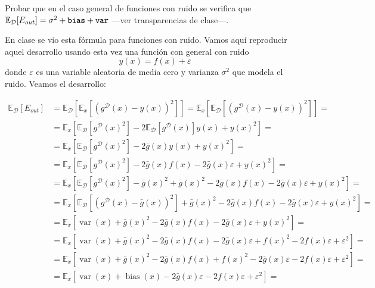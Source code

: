 \documentclass[a4paper, 11pt]{article}
\begin{document}
      \begin{ejercicio}
        Probar que en el caso general de funciones con ruido se verifica que $\mathbb{E}_{\mathcal{D}}[E_{out}]= \sigma^2+\texttt{\textbf{bias}}+\texttt{\textbf{var}}$ ---ver transparencias de clase---.
      \end{ejercicio}

      \begin{solucion}
          En clase se vio esta fórmula para funciones con ruido. Vamos aquí reproducir aquel desarrollo usando esta vez una función con general con ruido
          \[
          y(x) = f(x) + \varepsilon
          \]
          donde $\varepsilon$ es una variable aleatoria de media cero y varianza $\sigma^2$ que modela el ruido. Veamos el desarrollo:

          \begin{align*}
              \mathbb{E}_\mathcal{D}[E_{out}] &= \mathbb{E}_\mathcal{D}[\mathbb{E}_x[(g^\mathcal{D}(x) - y(x))^2]] = \mathbb{E}_x[\mathbb{E}_\mathcal{D}[(g^\mathcal{D}(x) - y(x))^2]] = \\
              &= \mathbb{E}_x[\mathbb{E}_\mathcal{D}[g^\mathcal{D}(x)^2] - 2\mathbb{E}_\mathcal{D}[g^\mathcal{D}(x)]y(x) + y(x)^2] = \\
              &= \mathbb{E}_x[\mathbb{E}_\mathcal{D}[g^\mathcal{D}(x)^2] - 2\bar{g}(x)y(x) + y(x)^2] = \\
              &= \mathbb{E}_x[\mathbb{E}_\mathcal{D}[g^\mathcal{D}(x)^2] - 2\bar{g}(x)f(x) -2\bar{g}(x)\varepsilon + y(x)^2] = \\
              &= \mathbb{E}_x[\mathbb{E}_\mathcal{D}[g^\mathcal{D}(x)^2] - \bar{g}(x)^2 +\bar{g}(x)^2 - 2\bar{g}(x)f(x) -2\bar{g}(x)\varepsilon + y(x)^2] = \\
              &= \mathbb{E}_x[\mathbb{E}_\mathcal{D}[(g^\mathcal{D}(x) - \bar{g}(x))^2] +\bar{g}(x)^2 - 2\bar{g}(x)f(x) -2\bar{g}(x)\varepsilon + y(x)^2] = \\
              &= \mathbb{E}_x[\operatorname{var}(x) +\bar{g}(x)^2 - 2\bar{g}(x)f(x) -2\bar{g}(x)\varepsilon + y(x)^2] = \\
              &= \mathbb{E}_x[\operatorname{var}(x) +\bar{g}(x)^2 - 2\bar{g}(x)f(x) -2\bar{g}(x)\varepsilon + f(x)^2 - 2f(x)\varepsilon + \varepsilon^2] = \\
              &= \mathbb{E}_x[\operatorname{var}(x) +\bar{g}(x)^2 - 2\bar{g}(x)f(x) + f(x)^2 -2\bar{g}(x)\varepsilon - 2f(x)\varepsilon + \varepsilon^2] = \\
              &= \mathbb{E}_x[\operatorname{var}(x) + \operatorname{bias}(x) -2\bar{g}(x)\varepsilon - 2f(x)\varepsilon + \varepsilon^2] = \\

\end{align*}
\end{solucion}
\end{document}
